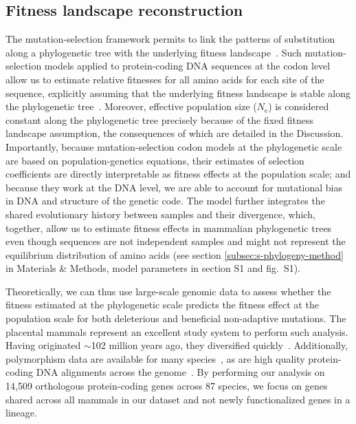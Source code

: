 \documentclass{article}
\newcommand{\Ne}{N_{\text{e}}}
\begin{document}
    \subsection*{Fitness landscape reconstruction}

    The mutation-selection framework permits to link the patterns of substitution along a phylogenetic tree with the underlying fitness landscape~\cite{halpern_evolutionary_1998, mccandlish_modeling_2014}.
    Such mutation-selection models applied to protein-coding DNA sequences at the codon level allow us to estimate relative fitnesses for all amino acids for each site of the sequence, explicitly assuming that the underlying fitness landscape is stable along the phylogenetic tree~\cite{rodrigue_mechanistic_2010, tamuri_estimating_2012, rodrigue_detecting_2017}.
    Moreover, effective population size ($\Ne$) is considered constant along the phylogenetic tree precisely because of the fixed fitness landscape assumption, the consequences of which are detailed in the Discussion.
    Importantly, because mutation-selection codon models at the phylogenetic scale are based on population-genetics equations, their estimates of selection coefficients are directly interpretable as fitness effects at the population scale; and because they work at the DNA level, we are able to account for mutational bias in DNA and structure of the genetic code.
    The model further integrates the shared evolutionary history between samples and their divergence, which, together, allow us to estimate fitness effects in mammalian phylogenetic trees even though sequences are not independent samples and might not represent the equilibrium distribution of amino acids (see section \ref{subsec:s-phylogeny-method} in Materials \& Methods, model parameters in section S1 and fig.~S1).

    Theoretically, we can thus use large-scale genomic data to assess whether the fitness estimated at the phylogenetic scale predicts the fitness effect at the population scale for both deleterious and beneficial non-adaptive mutations.
    The placental mammals represent an excellent study system to perform such analysis.
    Having originated $\sim$102 million years ago, they diversified quickly~\cite{foley_genomic_2023}.
    Additionally, polymorphism data are available for many species~\cite{howe_ensembl_2021}, as are high quality protein-coding DNA alignments across the genome~\cite{ranwez_orthomam_2007, scornavacca_orthomam_2019}.
    By performing our analysis on 14,509 orthologous protein-coding genes across 87 species, we focus on genes shared across all mammals in our dataset and not newly functionalized genes in a lineage.
\end{document}

